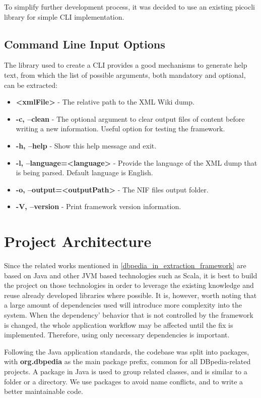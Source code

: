 \documentclass[thesis=M,english,hidelinks]{FITthesis}[2019/12/23]
\begin{document}
To simplify further development process, it was decided to use an existing picocli library for simple CLI implementation.

\subsection{Command Line Input Options}

The library used to create a \gls{CLI} provides a good mechanisms to generate help text, from which the list of possible arguments, both mandatory and optional, can be extracted:

\begin{itemize}
	\item  \textbf{\textless xmlFile\textgreater} - The relative path to the XML Wiki dump.
	\item \textbf{-c, --clean} - The optional argument to clear output files of content before writing a new information. Useful option for testing the framework.
	\item \textbf{-h, --help} - Show this help message and exit.
	\item \textbf{-l, --language=\textless language\textgreater} - Provide the language of the XML dump that is being parsed. Default language is English.
	\item \textbf{-o, --output=\textless outputPath\textgreater} - The NIF files output folder.
	\item \textbf{-V, --version} - Print framework version information.
\end{itemize}

\section{Project Architecture}

Since the related works mentioned in \ref{dbpedia_in_extraction_framework} are based on Java and other \gls{JVM} based technologies such as Scala, it is best to build the project on those technologies in order to leverage the existing knowledge and reuse already developed libraries where possible. It is, however, worth noting that a large amount of dependencies used will introduce more complexity into the system. When the dependency' behavior that is not controlled by the framework is changed, the whole application workflow may be affected until the fix is implemented. Therefore, using only necessary dependencies is important.



Following the Java application standards, the codebase was split into packages, with \textbf{org.dbpedia} as the main package prefix, common for all DBpedia-related projects. A package in Java is used to group related classes, and is similar to a folder or a directory. We use packages to avoid name conflicts, and to write a better maintainable code.
\end{document}
